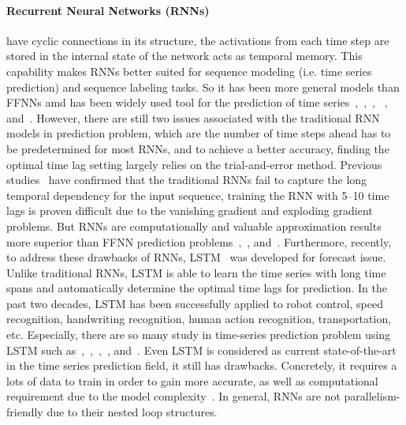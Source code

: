 \documentclass[review,3p,authoryear]{elsarticle}
\def \GN#1{\textcolor{tn_orange}{~#1}}			%
\begin{document}
\paragraph{Recurrent Neural Networks (RNNs)} have cyclic connections in its structure, the activations from each time step are stored in the internal state of the network acts as temporal memory. This capability makes RNNs better suited for sequence modeling (i.e. time series prediction) and sequence labeling tasks. So it has been more general models than FFNNs amd has been widely used tool for the prediction of time series~\citep{ref_connor},~\citep{ref_saad},~\citep{ref_petrosian},~ \citep{ref_pollastri}, and~\citep{ref_han}. However, there are still two issues associated with the traditional RNN models in prediction problem, which are the number of time steps ahead has to be predetermined for most RNNs, and to achieve a better accuracy, finding the optimal time lag setting largely relies on the trial-and-error method. Previous studies~\citep{ref_hochreiter} have confirmed that the traditional RNNs fail to capture the long temporal dependency for the input sequence, training the RNN with 5–10 time lags is proven difficult due to the vanishing gradient and exploding gradient problems. But RNNs are computationally and valuable approximation results more superior than FFNN prediction problems~\citep{ref_gency},~\citep{ref_kalaitzakis}, and~\citep{ref_saha}. Furthermore, recently, to address these drawbacks of RNNs, LSTM~\citep{ref_hochreiter} was developed for forecast issue. Unlike traditional RNNs, LSTM is able to learn the time series with long time spans and automatically determine the optimal time lags for prediction. In the past two decades, LSTM has been successfully applied to robot control, speed recognition, handwriting recognition, human action recognition, transportation, etc. Especially, there are so many study in time-series prediction problem using LSTM such as~\citep{ref_xiaolei},~\citep{ref_titan},~\citep{ref_zhao},~\citep{ref_azzouni}, and~\citep{ref_nhuan}. Even LSTM is considered as current state-of-the-art in the time series prediction field, it still has drawbacks. Concretely, it requires a lots of data to train in order to gain more accurate, as well as computational requirement due to the model complexity~\citep{ref_hardware}. In general, RNNs are not parallelism-friendly due to their nested loop structures.
\end{document}

